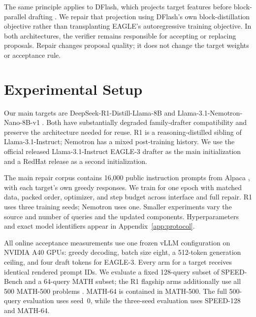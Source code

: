 \documentclass[11pt]{article}
\begin{document}
The same principle applies to DFlash, which projects target features before block-parallel drafting \citep{dflash2026}. We repair that projection using DFlash's own block-distillation objective rather than transplanting EAGLE's autoregressive training objective. In both architectures, the verifier remains responsible for accepting or replacing proposals. Repair changes proposal quality; it does not change the target weights or acceptance rule.

\begin{table}[t]
\centering
\small
\setlength{\tabcolsep}{6pt}

\caption{\textbf{Main repair results.} Brackets give 95\% CIs; $\Delta\tau$ is paired against the same family drafter's reuse. All arms use greedy decoding and $K=4$. SPEED has 128 queries; R1 repairs average three training seeds. R1 MATH uses all 500 queries with seed~0; Nemotron MATH uses 64 queries and one seed. The dedicated R1 model is an independently trained reference, not a matched-budget baseline. Independent 1B is included because acceptance alone does not determine wall-clock speed (Figure~\ref{fig:timing}).}
\label{tab:main}
\end{table}

\section{Experimental Setup}
\label{sec:setup}
Our main targets are DeepSeek-R1-Distill-Llama-8B \citep{deepseek2025} and Llama-3.1-Nemotron-Nano-8B-v1 \citep{nemotron2025}. Both have substantially degraded family-drafter compatibility and preserve the architecture needed for reuse. R1 is a reasoning-distilled sibling of Llama-3.1-Instruct; Nemotron has a mixed post-training history. We use the official released Llama-3.1-Instruct EAGLE-3 drafter as the main initialization and a RedHat release as a second initialization.

The main repair corpus contains 16,000 public instruction prompts from Alpaca \citep{alpaca2023}, with each target's own greedy responses. We train for one epoch with matched data, packed order, optimizer, and step budget across interface and full repair. R1 uses three training seeds; Nemotron uses one. Smaller experiments vary the source and number of queries and the updated components. Hyperparameters and exact model identifiers appear in Appendix~\ref{app:protocol}.

All online acceptance measurements use one frozen vLLM configuration \citep{vllm2023} on NVIDIA A40 GPUs: greedy decoding, batch size eight, a 512-token generation ceiling, and four draft tokens for EAGLE-3. Every arm for a target receives identical rendered prompt IDs. We evaluate a fixed 128-query subset of SPEED-Bench \citep{speed2026} and a 64-query MATH subset; the R1 flagship arms additionally use all 500 MATH-500 problems \citep{math2021,lightman2023}. MATH-64 is contained in MATH-500. The full 500-query evaluation uses seed~0, while the three-seed evaluation uses SPEED-128 and MATH-64.
\end{document}
